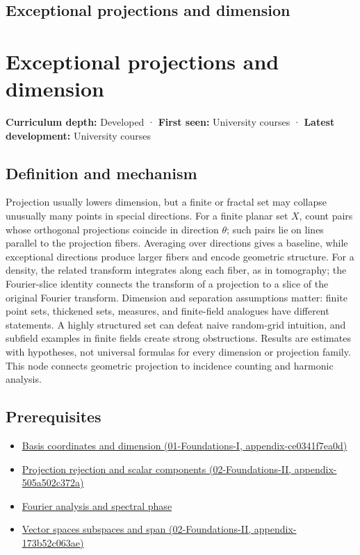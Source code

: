 \hypertarget{appendix-3c73f7862157}{}
\section*{Exceptional projections and dimension}
\chapter{Exceptional projections and dimension}\label{appendix-3c73f7862157-exceptional-projections-and-dimension}

\textbf{Curriculum depth:} Developed · \textbf{First seen:} University courses · \textbf{Latest development:} University courses

\section{Definition and mechanism}\label{appendix-3c73f7862157-definition-and-mechanism}

Projection usually lowers dimension, but a finite or fractal set may collapse unusually many points in special directions. For a finite planar set \(X\), count pairs whose orthogonal projections coincide in direction \(\theta\); such pairs lie on lines parallel to the projection fibers. Averaging over directions gives a baseline, while exceptional directions produce larger fibers and encode geometric structure. For a density, the related transform integrates along each fiber, as in tomography; the Fourier-slice identity connects the transform of a projection to a slice of the original Fourier transform. Dimension and separation assumptions matter: finite point sets, thickened sets, measures, and finite-field analogues have different statements. A highly structured set can defeat naive random-grid intuition, and subfield examples in finite fields create strong obstructions. Results are estimates with hypotheses, not universal formulas for every dimension or projection family. This node connects geometric projection to incidence counting and harmonic analysis.

\section{Prerequisites}\label{appendix-3c73f7862157-prerequisites}

\begin{itemize}
\tightlist
\item
  \href{../01-Foundations-I/main.pdf\#nameddest=appendix-ce0341f7ea0d}{Basis coordinates and dimension (01-Foundations-I, appendix-ce0341f7ea0d)}
\item
  \href{../02-Foundations-II/main.pdf\#nameddest=appendix-505a502c372a}{Projection rejection and scalar components (02-Foundations-II, appendix-505a502c372a)}
\item
  \hyperref[appendix-b60686ba06a1]{Fourier analysis and spectral phase}
\item
  \href{../02-Foundations-II/main.pdf\#nameddest=appendix-173b52c063ae}{Vector spaces subspaces and span (02-Foundations-II, appendix-173b52c063ae)}
\end{itemize}


